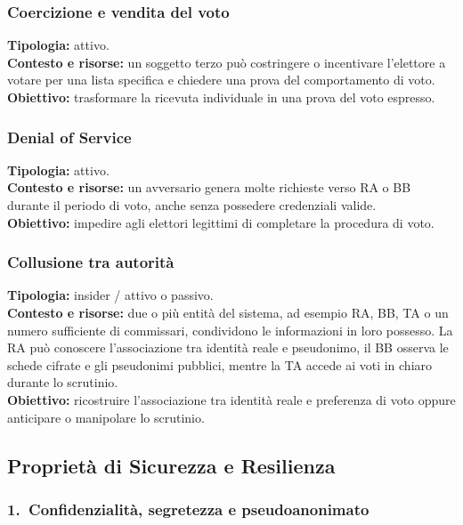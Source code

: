 \documentclass[12pt,a4paper]{article}
\begin{document}
\subsubsection*{Coercizione e vendita del voto}
\textbf{Tipologia:} attivo.\\
\textbf{Contesto e risorse:} un soggetto terzo pu\`o costringere o incentivare l'elettore a votare per una lista specifica e chiedere una prova del comportamento di voto.\\
\textbf{Obiettivo:} trasformare la ricevuta individuale in una prova del voto espresso.\\


\subsubsection*{Denial of Service}
\textbf{Tipologia:} attivo.\\
\textbf{Contesto e risorse:} un avversario genera molte richieste verso RA o BB durante il periodo di voto, anche senza possedere credenziali valide.\\
\textbf{Obiettivo:} impedire agli elettori legittimi di completare la procedura di voto.\\

\subsubsection*{Collusione tra autorit\`a}
\textbf{Tipologia:} insider / attivo o passivo.\\
\textbf{Contesto e risorse:} due o pi\`u entit\`a del sistema, ad esempio RA, BB, TA o un numero sufficiente di commissari, condividono le informazioni in loro possesso. La RA pu\`o conoscere l'associazione tra identit\`a reale e pseudonimo, il BB osserva le schede cifrate e gli pseudonimi pubblici, mentre la TA accede ai voti in chiaro durante lo scrutinio.\\
\textbf{Obiettivo:} ricostruire l'associazione tra identit\`a reale e preferenza di voto oppure anticipare o manipolare lo scrutinio.\\

\subsection{Propriet\`a di Sicurezza e Resilienza}

\subsubsection*{1.\ Confidenzialit\`a, segretezza e pseudoanonimato}
\end{document}
